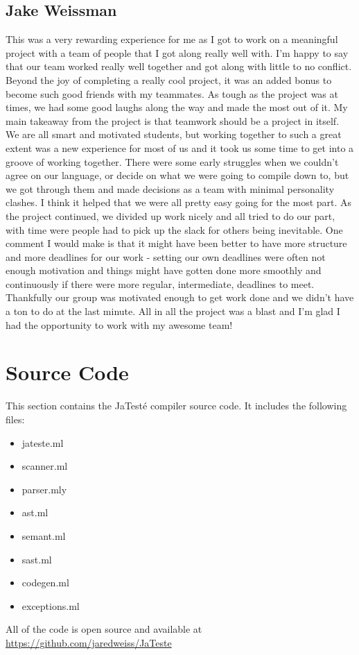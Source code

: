\documentclass{article}
\begin{document}
\subsection{Jake Weissman}
This was a very rewarding experience for me as I got to work on a meaningful project with a team of people that I got along really well with.  I'm happy to say that our team worked really well together and got along with little to no conflict.  Beyond the joy of completing a really cool project, it was an added bonus to become such good friends with my teammates.  As tough as the project was at times, we had some good laughs along the way and made the most out of it.  My main takeaway from the project is that teamwork should be a project in itself.  We are all smart and motivated students, but working together to such a great extent was a new experience for most of us and it took us some time to get into a groove of working together.  There were some early struggles when we couldn't agree on our language, or decide on what we were going to compile down to, but we got through them and made decisions as a team with minimal personality clashes.  I think it helped that we were all pretty easy going for the most part.  As the project continued, we divided up work nicely and all tried to do our part, with time were people had to pick up the slack for others being inevitable.  One comment I would make is that it might have been better to have more structure and more deadlines for our work - setting our own deadlines were often not enough motivation and things might have gotten done more smoothly and continuously if there were more regular, intermediate, deadlines to meet.  Thankfully our group was motivated enough to get work done and we didn't have a ton to do at the last minute.  All in all the project was a blast and I'm glad I had the opportunity to work with my awesome team!


\newpage

\section{Source Code}
This section contains the JaTest\'{e} compiler source code. It includes the following files:
\begin{itemize}
\item jateste.ml 
\item scanner.ml
\item parser.mly
\item ast.ml
\item semant.ml
\item sast.ml
\item codegen.ml
\item exceptions.ml
\end{itemize}
All of the code is open source and available at \url{https://github.com/jaredweiss/JaTeste}
\newpage
\end{document}
